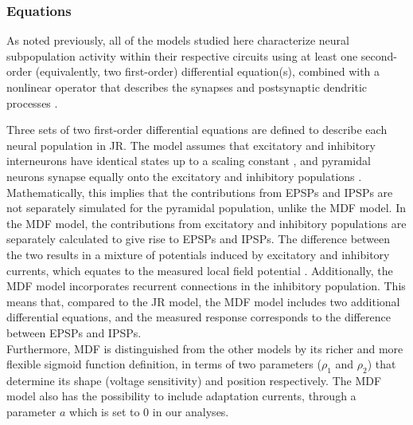 \documentclass[12pt,twoside]{article}
\begin{document}
\subsubsection{Equations}
As noted previously, all of the models studied here characterize neural subpopulation activity within their respective circuits using at least one second-order (equivalently, two first-order) differential equation(s), combined with a nonlinear operator that describes the synapses and postsynaptic dendritic processes \citep{ABURN}.

Three sets of two first-order differential equations are defined to describe each neural population in JR. The model assumes that excitatory and inhibitory interneurons have identical states up to a scaling constant \citep{ABURN}, and pyramidal neurons synapse equally onto the excitatory and inhibitory populations \citep{cook2021neural}. Mathematically, this implies that the contributions from EPSPs and IPSPs are not separately simulated for the pyramidal population, unlike the MDF model. In the MDF model, the contributions from excitatory and inhibitory populations are separately calculated to give rise to EPSPs and IPSPs. The difference between the two results in a mixture of potentials induced by excitatory and inhibitory currents, which  equates to the measured local field potential \citep{moran2007neural}. Additionally, the MDF model incorporates recurrent connections in the inhibitory population. This means that, compared to the JR model, the MDF model includes two additional differential equations, and the measured response corresponds to the difference between EPSPs and IPSPs. \\
Furthermore, MDF is distinguished from the other models by its richer and more flexible sigmoid function definition, in terms of two parameters ($\rho_{1}$ and $\rho_{2}$) that determine its shape (voltage sensitivity) and position respectively. The MDF model also has the possibility to include adaptation currents, through a parameter $a$ which is set to 0 in our analyses.
\end{document}
